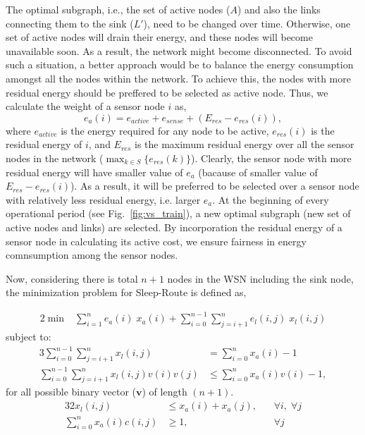 \documentclass[conference]{IEEEtran}
\begin{document}
The optimal subgraph, i.e., the set of active nodes ($A$) and also the links connecting them to the sink ($L'$), need to be changed over time. Otherwise, one set of active nodes will drain their energy, and these nodes will become unavailable soon. As a result, the network might become disconnected. To avoid such a situation, a better approach would be to balance the energy consumption amongst all the nodes within the network. To achieve this, the nodes with more residual energy should be preffered to be selected as active node. Thus, we calculate the weight of a sensor node $i$ as,
\begin{equation}
e_{a}(i) = e_{active} + e_{sense} + (E_{res} - e_{res}(i)),
\label{eq:nodecost}
\end{equation}
where $e_{active}$ is the energy required for any node to be active, $e_{res}(i)$ is the residual energy of $i$, and $E_{res}$ is the maximum residual energy over all the sensor nodes in the network ($\max_{k \in S}\{{e_{res}(k)}\}$). Clearly, the sensor node with more residual energy will have smaller value of $e_{a}$ (bacause of smaller value of $E_{res} - e_{res}(i)$). As a result, it will be preferred to be selected over a sensor node with relatively less residual energy, i.e. larger $e_{a}$. At the beginning of every operational period (see Fig.~\ref{fig:vs_train}), a new optimal subgraph (new set of active nodes and links) are selected. By incorporation the residual energy of a sensor node in calculating its active cost, we ensure fairness in energy comnsumption among the sensor nodes.

Now, considering there is total $n+1$ nodes in the WSN including the sink node, the minimization problem for Sleep-Route is defined as, 

\begin{alignat}{2}
\min & \sum_{i=1}^{n} e_{a}(i)\; x_{a}(i) + \sum_{i=0}^{n-1} \sum_{j=i+1}^{n} e_{l}(i,j)\; x_{l}(i,j) \label{eq:min_func}
\end{alignat}
subject to:
\begin{alignat}{3}
\sum_{i=0}^{n-1} \sum_{j=i+1}^{n} x_{l}(i,j) & = \sum_{i=0}^{n} x_{a}(i) - 1 \label{eq:tree} \\
\sum_{i=0}^{n-1} \sum_{j=i+1}^{n} x_{l}(i,j)v(i)v(j) & \leq \sum_{i=0}^{n} x_{a}(i)v(i) - 1, \label{eq:noloop}
\end{alignat}
for all possible binary vector ($\boldsymbol{v}$) of length $(n+1)$.
\begin{alignat}{3}
2x_{l}(i,j) & \leq x_{a}(i) + x_{a}(j), & ~~~~ \forall i, \; \forall j \label{eq:endpoints} \\
\sum_{i=0}^{n} x_{a}(i) c(i,j) & \geq 1, & ~~~~ \forall j \label{eq:representation}
\end{alignat}
\end{document}
